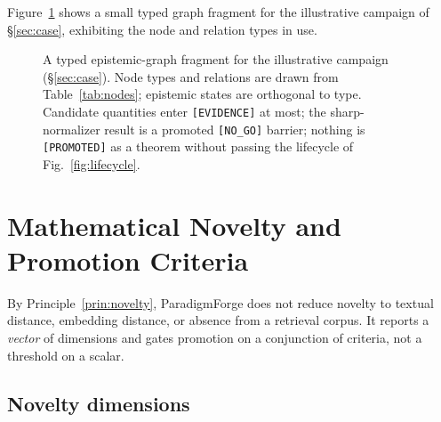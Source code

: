 \documentclass[11pt]{article}
\theoremstyle{definition}
\theoremstyle{remark}
\newcommand{\state}[1]{\texttt{[#1]}}
\newcommand{\PF}{ParadigmForge}
\begin{document}
Figure~\ref{fig:casegraph} shows a small typed graph fragment for the illustrative campaign of
\S\ref{sec:case}, exhibiting the node and relation types in use.

\begin{figure}[t]
\centering
\resizebox{0.92\textwidth}{!}{}
\caption{A typed epistemic-graph fragment for the illustrative campaign (\S\ref{sec:case}). Node
types and relations are drawn from Table~\ref{tab:nodes}; epistemic states are orthogonal to type.
Candidate quantities enter \state{EVIDENCE} at most; the sharp-normalizer result is a promoted
\state{NO\_GO} barrier; nothing is \state{PROMOTED} as a theorem without passing the lifecycle of
Fig.~\ref{fig:lifecycle}.}
\label{fig:casegraph}
\end{figure}

\section{Mathematical Novelty and Promotion Criteria}
\label{sec:novelty}

By Principle~\ref{prin:novelty}, \PF{} does not reduce novelty to textual distance, embedding
distance, or absence from a retrieval corpus. It reports a \emph{vector} of dimensions and gates
promotion on a conjunction of criteria, not a threshold on a scalar.

\subsection{Novelty dimensions}
\end{document}
